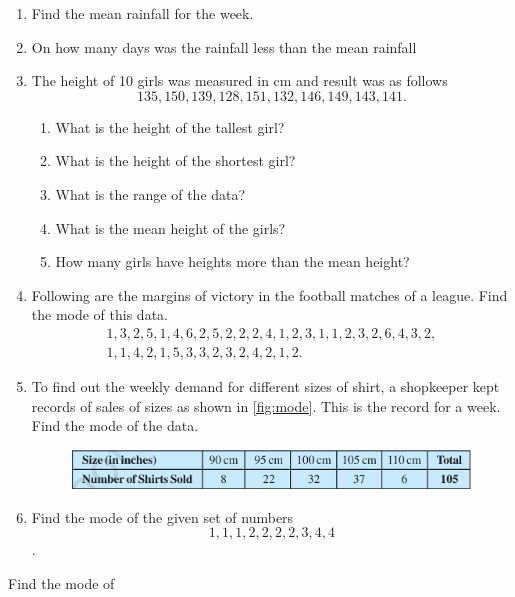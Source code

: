 \begin{enumerate}[label=\thesection.\arabic*, ref=\thesection.\theenumi]
\item Find the mean rainfall for the week.
\item On how many days was the rainfall less than the mean rainfall 
\item The height of 10 girls was measured in cm and result was as follows
	$$135, 150, 139, 128, 151, 132, 146, 149, 143, 141.$$
	\begin{enumerate}
		\item What is the height of the tallest girl?
		\item What is the height of the shortest girl?
		\item What is the range of the data?
		\item What is the mean height of the girls?
		\item How many girls have heights more than the mean height?
	\end{enumerate}
\item Following are the margins of victory in the football matches of a league.  Find the mode of this data.
	\begin{gather*}
	1,3,2,5,1,4,6,2,5,2,2,2,4,1,2,3,1,1,2,3,2,6,4,3,2,
	\\
	1,1,4,2,1,5,3,3,2,3,2,4,2,1,2.
	\end{gather*}
	\solution

\item To find out the weekly demand for different sizes of shirt, a shopkeeper kept records of sales of sizes as shown in 
  \eqref{fig:mode}.  This is the record for a week.  Find the mode of the data.
	\begin{figure}[H]
  \centering
  \includegraphics[width=\columnwidth]{figs/mode.jpg}
  \caption{}
  \label{fig:mode}
\end{figure}
\item Find the mode of the given set of numbers
	$$1,1,1,2,2,2,2,3,4,4$$.
\end{enumerate}
Find the mode of
